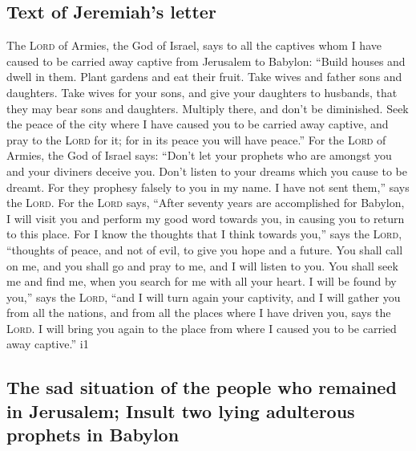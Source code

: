 \hypertarget{text-of-jeremiahs-letter}{%
\subsection{Text of Jeremiah's letter}\label{text-of-jeremiahs-letter}}

 The \textsc{Lord} of Armies, the God of Israel, says to
all the captives whom I have caused to be carried away captive from
Jerusalem to Babylon:  ``Build houses and dwell in them.
Plant gardens and eat their fruit.  Take wives and father
sons and daughters. Take wives for your sons, and give your daughters to
husbands, that they may bear sons and daughters. Multiply there, and
don't be diminished.  Seek the peace of the city where I
have caused you to be carried away captive, and pray to the
\textsc{Lord} for it; for in its peace you will have peace.''
 For the \textsc{Lord} of Armies, the God of Israel says:
``Don't let your prophets who are amongst you and your diviners deceive
you. Don't listen to your dreams which you cause to be dreamt.
 For they prophesy falsely to you in my name. I have not
sent them,'' says the \textsc{Lord}.  For the
\textsc{Lord} says, ``After seventy years are accomplished for Babylon,
I will visit you and perform my good word towards you, in causing you to
return to this place.  For I know the thoughts that I
think towards you,'' says the \textsc{Lord}, ``thoughts of peace, and
not of evil, to give you hope and a future.  You shall
call on me, and you shall go and pray to me, and I will listen to you.
 You shall seek me and find me, when you search for me
with all your heart.  I will be found by you,'' says the
\textsc{Lord}, ``and I will turn again your captivity, and I will gather
you from all the nations, and from all the places where I have driven
you, says the \textsc{Lord}. I will bring you again to the place from
where I caused you to be carried away captive.'' i1

\hypertarget{the-sad-situation-of-the-people-who-remained-in-jerusalem-insult-two-lying-adulterous-prophets-in-babylon}{%
\subsection{The sad situation of the people who remained in Jerusalem;
Insult two lying adulterous prophets in
Babylon}\label{the-sad-situation-of-the-people-who-remained-in-jerusalem-insult-two-lying-adulterous-prophets-in-babylon}}

